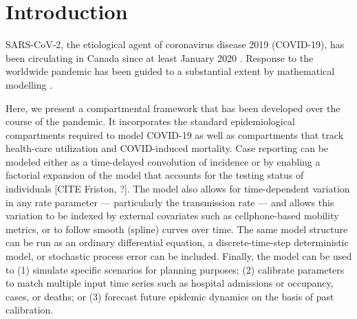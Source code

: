\documentclass[12pt]{article}\usepackage[]{graphicx}\usepackage[]{color}
\begin{document}

\tableofcontents




\section{Introduction}

SARS-CoV-2, the
etiological agent of coronavirus disease 2019 (COVID-19), has been
circulating in Canada since at least January 2020 \cite{onpr_200125}.
Response to the worldwide pandemic \cite{Li+20,Fauc+20} has been
guided to a substantial extent by mathematical modelling
\cite{Flax+20}.


Here, we present a compartmental framework that has been developed
over the course of the pandemic. It incorporates the standard epidemiological compartments
required to model COVID-19 as well as compartments that track health-care utilization and COVID-induced
mortality. Case reporting can be modeled either as a time-delayed convolution
of incidence or by enabling a factorial expansion of the model that accounts
for the testing status of individuals [CITE Friston, ?]. The model also allows
for time-dependent variation in any rate parameter --- particularly the transmission rate --- and
allows this variation to be indexed by external covariates such as cellphone-based mobility
metrics, or to follow smooth (spline) curves over time. The same model structure can be
run as an ordinary differential equation, a discrete-time-step deterministic model, or
stochastic process error can be included. Finally, the model can be used to
(1) simulate specific scenarios for planning purposes; (2) calibrate parameters 
to match multiple input time series such as hospital admissions or occupancy, cases, or deaths; or
(3) forecast future epidemic dynamics on the basis of past calibration.
\end{document}
